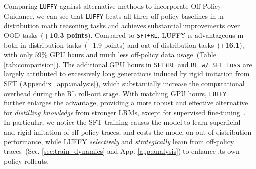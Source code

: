 \documentclass{article}
\newcommand{\m}[1]{\texttt{#1}}
\begin{document}
Comparing \m{LUFFY} against alternative methods to incorporate Off-Policy Guidance, we can see that \m{LUFFY} beats all three off-policy baselines in in-distribution math reasoning tasks and achieves substantial improvements over OOD tasks~(\textbf{+10.3 points}). 
Compared to \m{SFT+RL}, LUFFY is advantageous in both in-distribution tasks~(+1.9 points) and out-of-distribution tasks~(+\textbf{16.1}), with only 59\% GPU hours and much less off-policy data usage~(Table \ref{tab:comparision}). 
The additional GPU hours in \m{SFT+RL} and \m{RL w/ SFT Loss} are largely attributed to excessively long generations induced by rigid imitation from SFT (Appendix~\ref{app:analysis}), which substantially increase the computational overhead during the RL roll-out stage. 
With matching GPU hours, \m{LUFFY$\dagger$} further enlarges the advantage, providing a more robust and effective alternative for \textit{distilling knowledge} from stronger LRMs, except for supervised fine-tuning~\cite{r1,muennighoff2025s1,ye2025limo}. 
In particular, we notice the SFT training causes the model to learn superficial and rigid imitation of off-policy traces, and costs the model on out-of-distribution performance, while LUFFY \textit{selectively} and \textit{strategically} learn from off-policy traces~(Sec. \ref{sec:train_dynamics} and App. \ref{app:analysis}) to enhance its own policy rollouts. 

\end{document}
